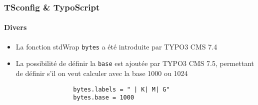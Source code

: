 \begin{frame}[fragile]
	\frametitle{TSconfig \& TypoScript}
	\framesubtitle{Divers}

	\begin{itemize}

		\item La fonction stdWrap \texttt{bytes} a été introduite par TYPO3 CMS 7.4

		\item La possibilité de définir la \texttt{base} est ajoutée par TYPO3 CMS 7.5,
			permettant de définir s'il on veut calculer avec la base 1000 ou 1024

			\begin{lstlisting}
				bytes.labels = " | K| M| G"
				bytes.base = 1000
			\end{lstlisting}

	\end{itemize}

\end{frame}

